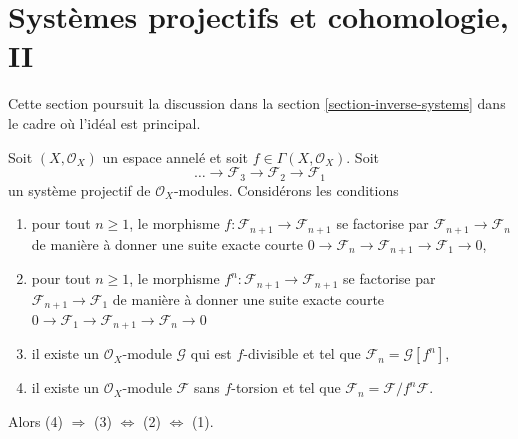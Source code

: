 \section{Systèmes projectifs et cohomologie, II}

\label{section-inverse-systems-bis}

\noindent
Cette section poursuit la discussion dans la section \ref{section-inverse-systems} dans le cadre où l'idéal est principal.

\begin{lemma}

\label{lemma-equivalent-f-good}

Soit $(X, \mathcal{O}_X)$ un espace annelé et soit $f \in \Gamma(X, \mathcal{O}_X)$. Soit
$$
\ldots \to \mathcal{F}_3 \to \mathcal{F}_2 \to \mathcal{F}_1
$$
un système projectif de $\mathcal{O}_X$-modules. Considérons les conditions

\begin{enumerate}

\item pour tout $n \geq 1$, le morphisme
$f : \mathcal{F}_{n + 1} \to \mathcal{F}_{n + 1}$ se factorise par $\mathcal{F}_{n + 1} \to \mathcal{F}_n$ de manière à donner une suite exacte courte
$0 \to \mathcal{F}_n \to \mathcal{F}_{n + 1} \to \mathcal{F}_1 \to 0$,
\item pour tout $n \geq 1$, le morphisme
$f^n : \mathcal{F}_{n + 1} \to \mathcal{F}_{n + 1}$
se factorise par $\mathcal{F}_{n + 1} \to \mathcal{F}_1$
de manière à donner une suite exacte courte
$0 \to \mathcal{F}_1 \to \mathcal{F}_{n + 1} \to \mathcal{F}_n \to 0$

\item il existe un $\mathcal{O}_X$-module $\mathcal{G}$
qui est $f$-divisible et tel que $\mathcal{F}_n = \mathcal{G}[f^n]$,
\item il existe un $\mathcal{O}_X$-module $\mathcal{F}$
sans $f$-torsion et tel que
$\mathcal{F}_n = \mathcal{F}/f^n\mathcal{F}$.

\end{enumerate}

Alors (4) $\Rightarrow$ (3) $\Leftrightarrow$ (2) $\Leftrightarrow$ (1).

\end{lemma}

